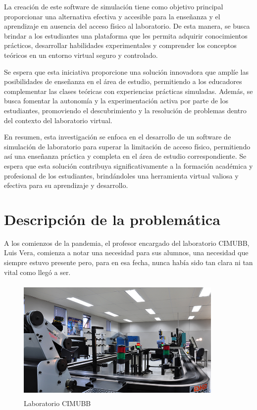 La creación de este software de simulación tiene como objetivo principal proporcionar una alternativa efectiva y accesible para la enseñanza y el aprendizaje en ausencia del acceso físico al laboratorio. De esta manera, se busca brindar a los estudiantes una plataforma que les permita adquirir conocimientos prácticos, desarrollar habilidades experimentales y comprender los conceptos teóricos en un entorno virtual seguro y controlado.

Se espera que esta iniciativa proporcione una solución innovadora que amplíe las posibilidades de enseñanza en el área de estudio, permitiendo a los educadores complementar las clases teóricas con experiencias prácticas simuladas. Además, se busca fomentar la autonomía y la experimentación activa por parte de los estudiantes, promoviendo el descubrimiento y la resolución de problemas dentro del contexto del laboratorio virtual.

En resumen, esta investigación se enfoca en el desarrollo de un software de simulación de laboratorio para superar la limitación de acceso físico, permitiendo así una enseñanza práctica y completa en el área de estudio correspondiente. Se espera que esta solución contribuya significativamente a la formación académica y profesional de los estudiantes, brindándoles una herramienta virtual valiosa y efectiva para su aprendizaje y desarrollo.

\section{Descripción de la problemática}
A los comienzos de la pandemia, el profesor encargado del laboratorio CIMUBB, Luis Vera, comienza a notar una necesidad para sus alumnos, una necesidad que siempre estuvo presente pero, para en esa fecha, nunca había sido tan clara ni tan vital como llegó a ser.

\clearpage

\begin{figure}[h]
\centering
\includegraphics[width=10cm, height=6cm]{figures/cimubb.jpg}
\caption{Laboratorio CIMUBB}
\label{fig:cimubb}
\end{figure}

